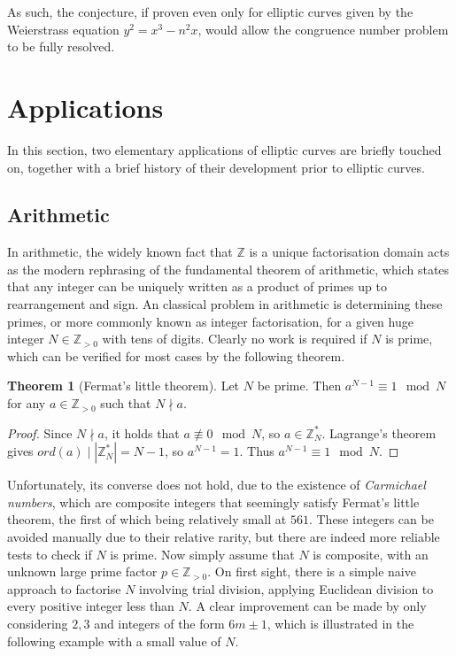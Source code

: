 \documentclass{article}
\newcommand{\Z}{\mathbb{Z}}
\newcommand{\rb}[1]{\left( #1 \right)}
\newcommand{\abs}[1]{\left\lvert #1 \right\rvert}
\theoremstyle{definition}
\newtheorem{theorem}[proposition]{Theorem}
\begin{document}
As such, the conjecture, if proven even only for elliptic curves given by the Weierstrass equation $ y^2 = x^3 - n^2x $, would allow the congruence number problem to be fully resolved.

\pagebreak

\section{Applications}

In this section, two elementary applications of elliptic curves are briefly touched on, together with a brief history of their development prior to elliptic curves.

\subsection{Arithmetic}

In arithmetic, the widely known fact that $ \Z $ is a unique factorisation domain acts as the modern rephrasing of the fundamental theorem of arithmetic, which states that any integer can be uniquely written as a product of primes up to rearrangement and sign. An classical problem in arithmetic is determining these primes, or more commonly known as integer factorisation, for a given huge integer $ N \in \Z_{> 0} $ with tens of digits. Clearly no work is required if $ N $ is prime, which can be verified for most cases by the following theorem.

\begin{theorem}[Fermat's little theorem]
Let $ N $ be prime. Then $ a^{N - 1} \equiv 1 \mod N $ for any $ a \in \Z_{> 0} $ such that $ N \nmid a $.
\end{theorem}

\begin{proof}
Since $ N \nmid a $, it holds that $ a \not\equiv 0 \mod N $, so $ a \in \Z_N^* $. Lagrange's theorem gives $ ord\rb{a} \mid \abs{\Z_N^*} = N - 1 $, so $ a^{N - 1} = 1 $. Thus $ a^{N - 1} \equiv 1 \mod N $.
\end{proof}

Unfortunately, its converse does not hold, due to the existence of \emph{Carmichael numbers}, which are composite integers that seemingly satisfy Fermat's little theorem, the first of which being relatively small at $ 561 $. These integers can be avoided manually due to their relative rarity, but there are indeed more reliable tests to check if $ N $ is prime. Now simply assume that $ N $ is composite, with an unknown large prime factor $ p \in \Z_{> 0} $. On first sight, there is a simple naive approach to factorise $ N $ involving trial division, applying Euclidean division to every positive integer less than $ N $. A clear improvement can be made by only considering $ 2, 3 $ and integers of the form $ 6m \pm 1 $, which is illustrated in the following example with a small value of $ N $.
\end{document}
